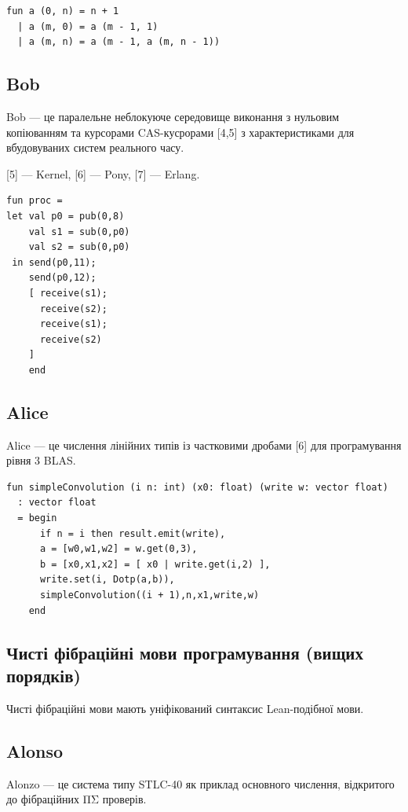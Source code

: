 \begin{lstlisting}
fun a (0, n) = n + 1
  | a (m, 0) = a (m - 1, 1)
  | a (m, n) = a (m - 1, a (m, n - 1))
\end{lstlisting}

\subsection*{Bob}

Bob — це паралельне неблокуюче середовище виконання з нульовим копіюванням
та курсорами CAS-кусрорами [4,5] з характеристиками для вбудовуваних систем
реального часу.

[5] — Kernel, [6] — Pony, [7] — Erlang.

\begin{lstlisting}
fun proc =
let val p0 = pub(0,8)
    val s1 = sub(0,p0)
    val s2 = sub(0,p0)
 in send(p0,11);
    send(p0,12);
    [ receive(s1);
      receive(s2);
      receive(s1);
      receive(s2)
    ]
    end
\end{lstlisting}

\subsection*{Alice}

Alice — це числення лінійних типів із частковими дробами [6] для програмування рівня 3 BLAS.

\begin{lstlisting}
fun simpleConvolution (i n: int) (x0: float) (write w: vector float)
  : vector float
  = begin
      if n = i then result.emit(write),
      a = [w0,w1,w2] = w.get(0,3),
      b = [x0,x1,x2] = [ x0 | write.get(i,2) ],
      write.set(i, Dotp(a,b)),
      simpleConvolution((i + 1),n,x1,write,w)
    end
\end{lstlisting}

\newpage
\subsection*{Чисті фібраційні мови програмування (вищих порядків)}

Чисті фібраційні мови мають уніфікований синтаксис Lean-подібної мови.

\subsection*{Alonso}

Alonzo — це система типу STLC-40 як приклад основного числення,
відкритого до фібраційних ΠΣ проверів.

